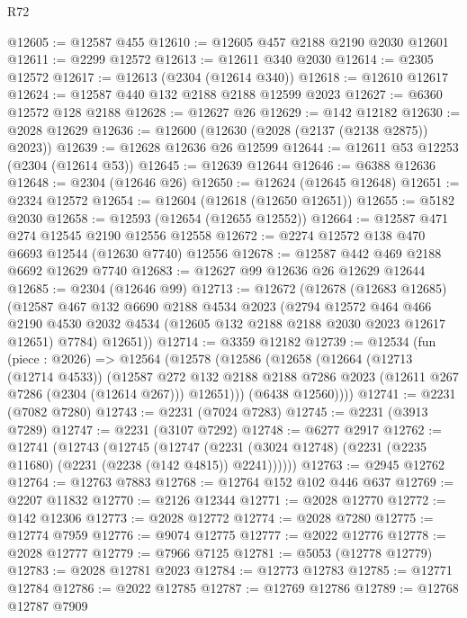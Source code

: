 \begin{lexlean}{R72}
\begin{coremodule}
@12605 := @12587 @455
@12610 := @12605 @457 @2188 @2190 @2030 @12601
@12611 := @2299 @12572
@12613 := @12611 @340 @2030
@12614 := @2305 @12572
@12617 := @12613 (@2304 (@12614 @340))
@12618 := @12610 @12617
@12624 := @12587 @440 @132 @2188 @2188 @12599 @2023
@12627 := @6360 @12572 @128 @2188
@12628 := @12627 @26
@12629 := @142 @12182
@12630 := @2028 @12629
@12636 := @12600 (@12630 (@2028 (@2137 (@2138 @2875)) @2023))
@12639 := @12628 @12636 @26 @12599
@12644 := @12611 @53 @12253 (@2304 (@12614 @53))
@12645 := @12639 @12644
@12646 := @6388 @12636
@12648 := @2304 (@12646 @26)
@12650 := @12624 (@12645 @12648)
@12651 := @2324 @12572
@12654 := @12604 (@12618 (@12650 @12651))
@12655 := @5182 @2030
@12658 := @12593 (@12654 (@12655 @12552))
@12664 := @12587 @471 @274 @12545 @2190 @12556 @12558
@12672 := @2274 @12572 @138 @470 @6693 @12544 (@12630 @7740) @12556
@12678 := @12587 @442 @469 @2188 @6692 @12629 @7740
@12683 := @12627 @99 @12636 @26 @12629 @12644
@12685 := @2304 (@12646 @99)
@12713 := @12672
    (@12678
      (@12683 @12685)
      (@12587
        @467
        @132
        @6690
        @2188
        @4534
        @2023
        (@2794
          @12572
          @464
          @466
          @2190
          @4530
          @2032
          @4534
          (@12605 @132 @2188 @2188 @2030 @2023 @12617 @12651)
          @7784)
        @12651))
@12714 := @3359 @12182
@12739 := @12534
    (fun (piece : @2026) =>
    @12564
      (@12578
        (@12586
          (@12658
            (@12664
              (@12713 (@12714 @4533))
              (@12587
                @272
                @132
                @2188
                @2188
                @7286
                @2023
                (@12611 @267 @7286 (@2304 (@12614 @267)))
                @12651)))
          (@6438 @12560))))
@12741 := @2231 (@7082 @7280)
@12743 := @2231 (@7024 @7283)
@12745 := @2231 (@3913 @7289)
@12747 := @2231 (@3107 @7292)
@12748 := @6277 @2917
@12762 := @12741
    (@12743
      (@12745
        (@12747 (@2231 (@3024 @12748) (@2231 (@2235 @11680) (@2231 (@2238 (@142 @4815)) @2241))))))
@12763 := @2945 @12762
@12764 := @12763 @7883
@12768 := @12764 @152 @102 @446 @637
@12769 := @2207 @11832
@12770 := @2126 @12344
@12771 := @2028 @12770
@12772 := @142 @12306
@12773 := @2028 @12772
@12774 := @2028 @7280
@12775 := @12774 @7959
@12776 := @9074 @12775
@12777 := @2022 @12776
@12778 := @2028 @12777
@12779 := @7966 @7125
@12781 := @5053 (@12778 @12779)
@12783 := @2028 @12781 @2023
@12784 := @12773 @12783
@12785 := @12771 @12784
@12786 := @2022 @12785
@12787 := @12769 @12786
@12789 := @12768 @12787 @7909

\end{coremodule}
\end{lexlean}
